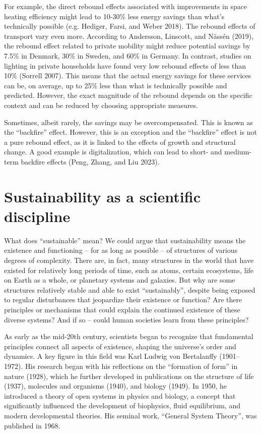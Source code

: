 \documentclass[
  a4paper,
  openany]{book}
\begin{document}
For example, the direct rebound effects associated with improvements in
space heating efficiency might lead to 10-30\% less energy savings than
what's technically possible (e.g. Hediger, Farsi, and Weber 2018). The
rebound effects of transport vary even more. According to Andersson,
Linscott, and Nässén (2019), the rebound effect related to private
mobility might reduce potential savings by 7.5\% in Denmark, 30\% in
Sweden, and 60\% in Germany. In contrast, studies on lighting in private
households have found very low rebound effects of less than 10\%
(Sorrell 2007). This means that the actual energy savings for these
services can be, on average, up to 25\% less than what is technically
possible and predicted. However, the exact magnitude of the rebound
depends on the specific context and can be reduced by choosing
appropriate measures.

Sometimes, albeit rarely, the savings may be overcompensated. This is
known as the ``backfire'' effect. However, this is an exception and the
``backfire'' effect is not a pure rebound effect, as it is linked to the
effects of growth and structural change. A good example is
digitalization, which can lead to short- and medium-term backfire
effects (Peng, Zhang, and Liu 2023).

\section{Sustainability as a scientific
discipline}\label{sustainability-as-a-scientific-discipline}

What does ``sustainable'' mean? We could argue that sustainability means
the existence and functioning -- for as long as possible -- of
structures of various degrees of complexity. There are, in fact, many
structures in the world that have existed for relatively long periods of
time, such as atoms, certain ecosystems, life on Earth as a whole, or
planetary systems and galaxies. But why are some structures relatively
stable and able to exist ``sustainably'', despite being exposed to
regular disturbances that jeopardize their existence or function? Are
there principles or mechanisms that could explain the continued
existence of these diverse systems? And if so -- could human societies
learn from these principles?

As early as the mid-20th century, scientists began to recognize that
fundamental principles connect all aspects of existence, shaping the
universe's order and dynamics. A key figure in this field was Karl
Ludwig von Bertalanffy (1901--1972). His research began with his
reflections on the ``formation of form'' in nature (1928), which he
further developed in publications on the structure of life (1937),
molecules and organisms (1940), and biology (1949). In 1950, he
introduced a theory of open systems in physics and biology, a concept
that significantly influenced the development of biophysics, fluid
equilibrium, and modern developmental theories. His seminal work,
``General System Theory'', was published in 1968.
\end{document}
